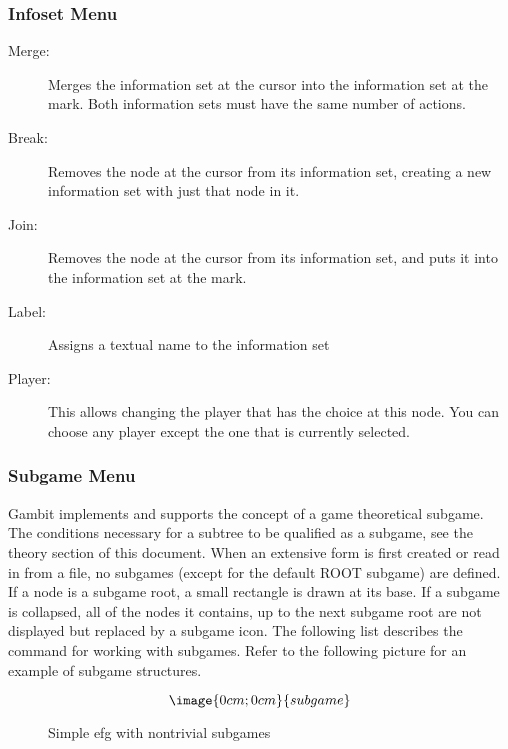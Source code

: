 \subsubsection{Infoset Menu}
\begin{description}
\item[Merge:] Merges the information set at the cursor into the information set at 
the mark.  Both information sets must have the same number of actions.  
\item[Break:] Removes the node at the cursor from its information set, creating a new 
information set with just that node in it. 
\item[Join:] Removes the node at the cursor from its information set, and puts it into 
the information set at the mark.  
\item[Label:] Assigns a textual name to the information set
\item[Player:]  This allows changing the player that has the choice
at this node.  You can choose any player except the one that is currently
selected.
\end{description}

\subsubsection{Subgame Menu}
Gambit implements and supports the concept of a game theoretical subgame. The
conditions necessary for a subtree to be qualified as a subgame, see the
theory section of this document.  When an extensive form is first created or
read in from a file, no subgames (except for the default ROOT subgame) are 
defined.  If a node is a subgame root, a small rectangle is drawn at its base.
If a subgame is collapsed, all of the nodes it contains, up to the next
subgame root are not displayed but replaced by a subgame icon.
The following list describes the command for working with subgames.
Refer to the following picture for an example of subgame structures.
\begin{figure}
$$\image{0cm;0cm}{subgame}$$
\caption{Simple efg with nontrivial subgames}\label{fig_subgames}
\end{figure}

